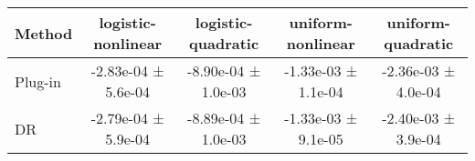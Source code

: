 \begin{tabular}{lcccc}
\toprule
Method & logistic-nonlinear & logistic-quadratic & uniform-nonlinear & uniform-quadratic \\
\midrule
Plug-in & -2.83e-04 ± 5.6e-04 & -8.90e-04 ± 1.0e-03 & -1.33e-03 ± 1.1e-04 & -2.36e-03 ± 4.0e-04 \\
DR & -2.79e-04 ± 5.9e-04 & -8.89e-04 ± 1.0e-03 & -1.33e-03 ± 9.1e-05 & -2.40e-03 ± 3.9e-04 \\
\bottomrule
\end{tabular}
